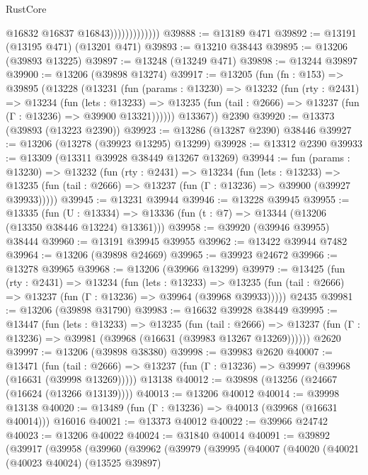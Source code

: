 \begin{lexlean}{RustCore}
\begin{coremodule}
                              @16832
                              @16837
                              @16843)))))))))))))
@39888 := @13189 @471
@39892 := @13191 (@13195 @471) (@13201 @471)
@39893 := @13210 @38443
@39895 := @13206 (@39893 @13225)
@39897 := @13248 (@13249 @471)
@39898 := @13244 @39897
@39900 := @13206 (@39898 @13274)
@39917 := @13205
    (fun (fn : @153) =>
    @39895
      (@13228
        (@13231
          (fun (params : @13230) =>
          @13232
            (fun (rty : @2431) =>
            @13234
              (fun (lets : @13233) =>
              @13235 (fun (tail : @2666) => @13237 (fun (Γ : @13236) => @39900 @13321))))))
        @13367))
    @2390
@39920 := @13373 (@39893 (@13223 @2390))
@39923 := @13286 (@13287 @2390) @38446
@39927 := @13206 (@13278 (@39923 @13295) @13299)
@39928 := @13312 @2390
@39933 := @13309 (@13311 @39928 @38449 @13267 @13269)
@39944 := fun (params : @13230) =>
  @13232
    (fun (rty : @2431) =>
    @13234
      (fun (lets : @13233) =>
      @13235 (fun (tail : @2666) => @13237 (fun (Γ : @13236) => @39900 (@39927 @39933)))))
@39945 := @13231 @39944
@39946 := @13228 @39945
@39955 := @13335
    (fun (U : @13334) => @13336 (fun (t : @7) => @13344 (@13206 (@13350 @38446 @13224) @13361)))
@39958 := @39920 (@39946 @39955) @38444
@39960 := @13191 @39945 @39955
@39962 := @13422 @39944 @7482
@39964 := @13206 (@39898 @24669)
@39965 := @39923 @24672
@39966 := @13278 @39965
@39968 := @13206 (@39966 @13299)
@39979 := @13425
    (fun (rty : @2431) =>
    @13234
      (fun (lets : @13233) =>
      @13235 (fun (tail : @2666) => @13237 (fun (Γ : @13236) => @39964 (@39968 @39933)))))
    @2435
@39981 := @13206 (@39898 @31790)
@39983 := @16632 @39928 @38449
@39995 := @13447
    (fun (lets : @13233) =>
    @13235
      (fun (tail : @2666) =>
      @13237 (fun (Γ : @13236) => @39981 (@39968 (@16631 (@39983 @13267 @13269))))))
    @2620
@39997 := @13206 (@39898 @38380)
@39998 := @39983 @2620
@40007 := @13471
    (fun (tail : @2666) => @13237 (fun (Γ : @13236) => @39997 (@39968 (@16631 (@39998 @13269)))))
    @13138
@40012 := @39898 (@13256 (@24667 (@16624 (@13266 @13139))))
@40013 := @13206 @40012
@40014 := @39998 @13138
@40020 := @13489 (fun (Γ : @13236) => @40013 (@39968 (@16631 @40014))) @16016
@40021 := @13373 @40012
@40022 := @39966 @24742
@40023 := @13206 @40022
@40024 := @31840 @40014
@40091 := @39892
    (@39917
      (@39958
        (@39960
          (@39962
            (@39979
              (@39995
                (@40007
                  (@40020
                    (@40021
                      (@40023 @40024)
                      (@13525 @39897)

\end{coremodule}
\end{lexlean}
